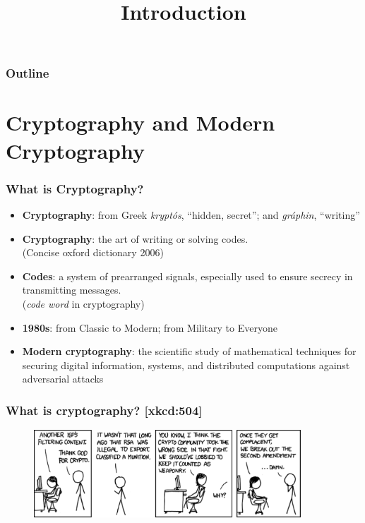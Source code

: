 

\title{Introduction}


\maketitle
\begin{frame}
\frametitle{Outline}
\tableofcontents
\end{frame}
\section{Cryptography and Modern Cryptography}
\begin{frame}\frametitle{What is Cryptography?}
\begin{itemize}
\item \textbf{Cryptography}: from Greek \emph{krypt\'os}, ``hidden, secret''; and \emph{gr\'{a}phin}, ``writing''
\item \textbf{Cryptography}: the art of writing or solving codes.\\ (Concise oxford dictionary 2006)
\item \textbf{Codes}: a system of prearranged signals, especially used to ensure secrecy in transmitting messages. \\ (\emph{code word} in cryptography)
\item \textbf{1980s}: from Classic to Modern; from Military to Everyone
\item \textbf{Modern cryptography}: the scientific study of mathematical techniques for securing digital information, systems, and distributed computations against adversarial attacks
\end{itemize}
\end{frame}
\begin{frame}\frametitle{What is cryptography? [xkcd:504]}
\begin{figure}
\begin{center}
\includegraphics[width=100mm]{pic/legal} 
\end{center}
\end{figure}
\end{frame}

